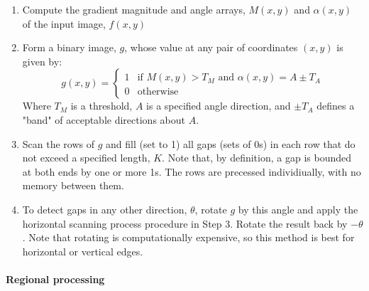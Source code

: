 \begin{enumerate}
	\item Compute the gradient magnitude and angle arrays, $M(x,y)$ and $\alpha(x,y)$ of the input image, $f(x,y)$
	\item Form a binary image, $g$, whose value at any pair of coordinates $(x,y)$ is given by:
		\[
			g(x,y) = 
				\begin{cases}
					1 & \text{if } M(x,y) > T_M \text{ and } \alpha(x,y) = A \pm T_A\\
					0 & \text{otherwise}
				\end{cases}
		\]
		Where $T_M$ is a threshold, $A$ is a specified angle direction, and $\pm T_A$ defines a "band" of acceptable directions about $A$.
	\item Scan the rows of $g$ and fill (set to 1) all gaps (sets of 0s) in each row that do not exceed a specified length, $K$.
		Note that, by definition, a gap is bounded at both ends by one or more 1s. 
		The rows are precessed individiually, with no memory between them.
	\item To detect gaps in any other direction, $\theta$, rotate $g$ by this angle and apply the horizontal scanning process procedure in Step 3.
		Rotate the result back by $-\theta$. Note that rotating is computationally expensive, so this method is best for horizontal or vertical edges.
\end{enumerate}


\paragraph{Regional processing}

